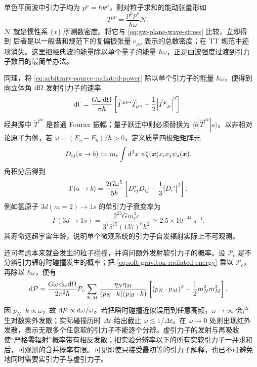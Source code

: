单色平面波中引力子均为 $p^\mu=\hbar k^\mu$，则对粒子求和的能动张量形如
\[
    T^{\mu\nu} = \frac{p^\mu p^\nu}{\hbar\omega} \mathscr N,
\]
$\mathscr N$ 就是惯性系 $\{x\}$ 所测数密度。将它与 \eqref{eq:gw-plane-wave-stress} 比较，立即得到
后者是以一般谐和规范下的复偏振张量 $e_{\mu\nu}$ 表示的总数密度；在 TT 规范中迹项消失。这里把经典波的能量除以单个量子的能量 $\hbar\omega$，正是由波强度过渡到引力子数目的最简单办法。

同理，将 \eqref{eq:arbitrary-source-radiated-power} 除以单个引力子的能量 $\hbar\omega$，便得到向立体角 $\dd\Omega$ 发射引力子的速率
\begin{equation}\label{eq:graviton-emission-rate}
    \dd\Gamma=\frac{G\omega\,\dd\Omega}{\pi\hbar}
    \left[\widetilde T^{\mu\nu *}\widetilde T_{\mu\nu}
    -\frac12\abs{\widetilde T^\mu{}_\mu}^2\right].
\end{equation}
经典源中 $\widetilde T^{\mu\nu}$ 是普通 Fourier 振幅；量子跃迁中则必须替换为 $\langle b|\widehat T^{\mu\nu}|a\rangle$。以非相对论原子为例，若 $\omega=(E_a-E_b)/\hbar>0$，定义质量四极矩矩阵元
\[
    D_{ij}(a\to b):=m_e\int\dd[3]{x}\,\psi_b^*(\bm x)x_i x_j\psi_a(\bm x).
\]
角积分后得到
\[
    \Gamma(a\to b)=\frac{2G\omega^5}{5\hbar}
    \left[D_{ij}^*D_{ij}-\frac13\abs{D_i{}^i}^2\right].
\]
例如氢原子 $3d(m=2)\to1s$ 的单引力子衰变率为
\[
    \Gamma(3d\to1s)
    =\frac{2^{23}Gm_e^3c}{3^7 5^{15}(137)^6\hbar^2}
    \simeq2.5\times10^{-44}\ \mathrm{s}^{-1}.
\]
其寿命远超宇宙年龄，说明单个微观系统的引力子自发辐射实际上不可观测。

还可考虑本来就会发生的粒子碰撞，并询问额外发射软引力子的概率。设 $\mathcal P_c$ 是不分辨引力辐射时碰撞发生的概率；把 \eqref{eq:soft-graviton-radiated-energy} 乘以 $\mathcal P_c$，再除以 $\hbar\omega$，便有
\begin{equation}\label{eq:soft-graviton-emission}
    \dd\mathcal P=\frac{G\omega\,\dd\omega\dd\Omega}{2\pi^2\hbar}\mathcal P_c
    \sum_{N,M}\frac{\eta_N\eta_M}{(p_N\cdot k)(p_M\cdot k)}
    \left[(p_N\cdot p_M)^2-\frac12m_N^2m_M^2\right].
\end{equation}
因 $p_N\cdot k\propto\omega$，故 $\dd\mathcal P\propto\dd\omega/\omega$。若把瞬时碰撞近似误用到任意高频，$\omega\to\infty$ 会产生对数紫外发散；实际碰撞历时 $\Delta t$ 给出截止 $\omega\lesssim1/\Delta t$。在 $\omega\to0$ 处则出现红外发散，表示无限多个任意软的引力子不能逐个分辨。虚引力子的发射与再吸收使“严格零辐射”概率带有相反发散；把实验分辨率以下的所有实软引力子一并求和后，可观测的含并概率有限。可见即使只接受最初等的引力子解释，也已不可避免地同时需要实引力子与虚引力子。

